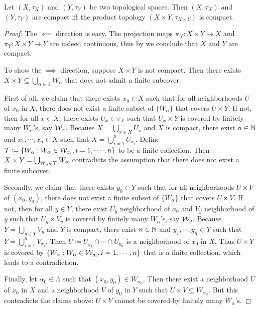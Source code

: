 \documentclass[screen]{techreport}
\numberwithin{equation}{section}
\begin{document}
\begin{theorem}\label{The:ProductOfCompactStillCompact}
	Let $(X,\tau_X)$ and $(Y,\tau_Y)$ be two topological spaces.
	Then $(X,\tau_X)$ and $(Y,\tau_Y)$ are compact iff the product topology $(X \times Y,\tau_{X \times Y})$ is compact. 
\end{theorem}
\begin{proof}
	The $\impliedby$ direction is easy.
	The projection maps $\pi_X : X \times Y \to X$ and $\pi_Y : X \times Y \to Y$ are indeed continuous, thus by  we conclude that $X$ and $Y$ are compact.
	
	To show the $\implies$ direction, suppose $X \times Y$ is not compact.
	Then there exists $X \times Y \subseteq \bigcup_{\alpha \in \Lambda} W_\alpha$ that does not admit a finite subcover.
	
	First of all, we claim that there exists $x_0 \in X$ such that for all neighborhoods $U$ of $x_0$ in $X$, there does not exist a finite subset of $\{W_\alpha\}$ that covers $U \times Y$.
	If not, then for all $x \in X$, there exists $U_x \in \tau_X$ such that $U_x \times Y$ is covered by finitely many $W_\alpha$'s, say $\mathcal{W}_x$.
	Because $X = \bigcup_{x \in X} U_x$ and $X$ is compact, there exist $n \in \mathbb{N}$ and $x_1,\cdots,x_n \in X$ such that $X = \bigcup_{i=1}^n U_{x_i}$.
	Define $\mathcal{T} \coloneqq \{ W_\alpha : W_\alpha \in \mathcal{W}_{x_i}, i=1,\cdots,n\}$ to be a finite collection.
	Then $X \times Y = \bigcup_{W_\alpha \in \mathcal{T}} W_\alpha$ contradicts the assumption that there does not exist a finite subcover.
	
	Secondly, we claim that there exists $y_0 \in Y$ such that for all neighborhoods $U \times V$ of $(x_0,y_0)$, there does not exist a finite subset of $\{ W_\alpha \}$ that covers $U \times V$.
	If not, then for all $y \in Y$, there exist $U_y$ neighborhood of $x_0$ and $V_y$ neighborhood of $y$ such that $U_y \times V_y$ is covered by finitely many $W_\alpha$'s, say $\mathcal{W}_y$.
	Because $Y = \bigcup_{y \in Y} V_y$ and $Y$ is compact, there exist $n \in \mathbb{N}$ and $y_1,\cdots,y_n \in Y$ such that $Y = \bigcup_{i=1}^n V_{x_i}$.
	Then $U \coloneqq U_{y_1} \cap \cdots \cap U_{y_n}$ is a neighborhood of $x_0$ in $X$.
	Thus $U \times Y$ is covered by $\{ W_\alpha : W_\alpha \in \mathcal{W}_{y_i}, i=1,\cdots,n\}$ that is a finite collection, which leads to a contradiction.
	
	Finally, let $\alpha_0 \in \Lambda$ such that $(x_0,y_0) \in W_{\alpha_0}$.
	Then there exist a neighborhood $U$ of $x_0$ in $X$ and a neighborhood $V$ of $y_0$ in $Y$ such that $U \times V \subseteq W_{\alpha_0}$.
	But this contradicts the claims above: $U \times V$ cannot be covered by finitely many $W_\alpha$'s.
\end{proof}
\end{document}
